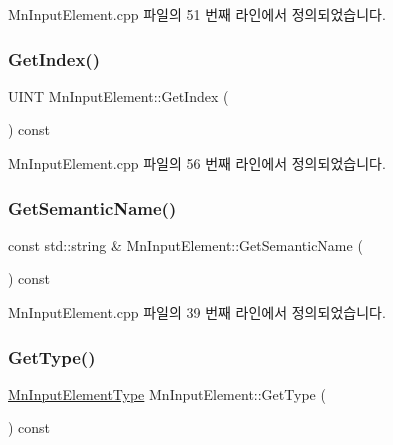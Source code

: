 Mn\+Input\+Element.\+cpp 파일의 51 번째 라인에서 정의되었습니다.

\mbox{\label{class_m_n_l_1_1_mn_input_element_a314bdce70c4781632737c247c040f014}} 
\subsubsection{\texorpdfstring{Get\+Index()}{GetIndex()}}
{\footnotesize\ttfamily U\+I\+NT Mn\+Input\+Element\+::\+Get\+Index (\begin{DoxyParamCaption}{ }\end{DoxyParamCaption}) const}



Mn\+Input\+Element.\+cpp 파일의 56 번째 라인에서 정의되었습니다.

\mbox{\label{class_m_n_l_1_1_mn_input_element_a6aa08fd62581e1eddc7e632de0bd9564}} 
\subsubsection{\texorpdfstring{Get\+Semantic\+Name()}{GetSemanticName()}}
{\footnotesize\ttfamily const std\+::string \& Mn\+Input\+Element\+::\+Get\+Semantic\+Name (\begin{DoxyParamCaption}{ }\end{DoxyParamCaption}) const}



Mn\+Input\+Element.\+cpp 파일의 39 번째 라인에서 정의되었습니다.

\mbox{\label{class_m_n_l_1_1_mn_input_element_a21970e5ba0187033e34bec04da162741}} 
\subsubsection{\texorpdfstring{Get\+Type()}{GetType()}}
{\footnotesize\ttfamily \hyperlink{namespace_m_n_l_a8605571a36b2bb477280767d71fe6f9e}{Mn\+Input\+Element\+Type} Mn\+Input\+Element\+::\+Get\+Type (\begin{DoxyParamCaption}{ }\end{DoxyParamCaption}) const}



